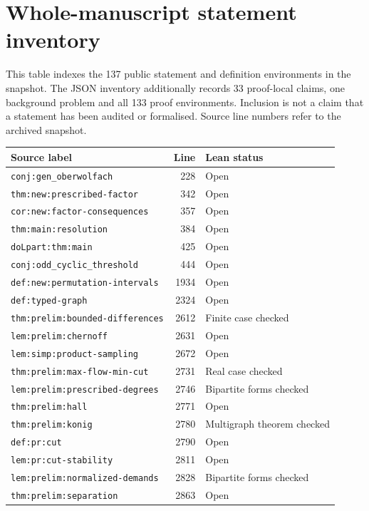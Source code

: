 \appendix
\chapter{Whole-manuscript statement inventory}
This table indexes the 137 public statement and definition environments in the
snapshot. The JSON inventory additionally records 33 proof-local claims,
one background problem and all 133 proof environments. Inclusion is not a claim
that a statement has been audited or formalised. Source line numbers refer to
the archived snapshot.
\small
\begin{longtable}{p{}r >{\raggedright\arraybackslash}p{}}
\toprule Source label & Line & Lean status \\ \midrule\endhead
\nolinkurl{conj:gen_oberwolfach} & 228 & Open \\
\nolinkurl{thm:new:prescribed-factor} & 342 & Open \\
\nolinkurl{cor:new:factor-consequences} & 357 & Open \\
\nolinkurl{thm:main:resolution} & 384 & Open \\
\nolinkurl{doLpart:thm:main} & 425 & Open \\
\nolinkurl{conj:odd_cyclic_threshold} & 444 & Open \\
\nolinkurl{def:new:permutation-intervals} & 1934 & Open \\
\nolinkurl{def:typed-graph} & 2324 & Open \\
\nolinkurl{thm:prelim:bounded-differences} & 2612 & Finite case checked \\
\nolinkurl{lem:prelim:chernoff} & 2631 & Open \\
\nolinkurl{lem:simp:product-sampling} & 2672 & Open \\
\nolinkurl{thm:prelim:max-flow-min-cut} & 2731 & Real case checked \\
\nolinkurl{lem:prelim:prescribed-degrees} & 2746 & Bipartite forms checked \\
\nolinkurl{thm:prelim:hall} & 2771 & Open \\
\nolinkurl{thm:prelim:konig} & 2780 & Multigraph theorem checked \\
\nolinkurl{def:pr:cut} & 2790 & Open \\
\nolinkurl{lem:pr:cut-stability} & 2811 & Open \\
\nolinkurl{lem:prelim:normalized-demands} & 2828 & Bipartite forms checked \\
\nolinkurl{thm:prelim:separation} & 2863 & Open \\

\end{longtable}

